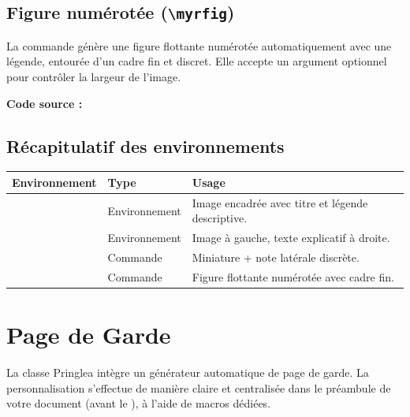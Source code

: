 \subsection{Figure numérotée (\texttt{\textbackslash myrfig})}

La commande  génère une figure flottante numérotée automatiquement avec une légende, entourée d'un cadre fin et discret. Elle accepte un argument optionnel pour contrôler la largeur de l'image.


\textbf{Code source :}
\begin{texblock}

\end{texblock}

\subsection{Récapitulatif des environnements}

\vspace{10pt}
\begin{tabularx}{\textwidth}{L{3.5cm} L{3.5cm} X}
    \toprule
    \textbf{Environnement} & \textbf{Type} & \textbf{Usage} \\
    \midrule
     & Environnement & Image encadrée avec titre et légende descriptive. \\
     & Environnement & Image à gauche, texte explicatif à droite. \\
     & Commande & Miniature + note latérale discrète. \\
     & Commande & Figure flottante numérotée avec cadre fin. \\
    \bottomrule
\end{tabularx}
\section{Page de Garde}

La classe Pringlea intègre un générateur automatique de page de garde. La personnalisation s'effectue de manière claire et centralisée dans le préambule de votre document (avant le ), à l'aide de macros dédiées.


